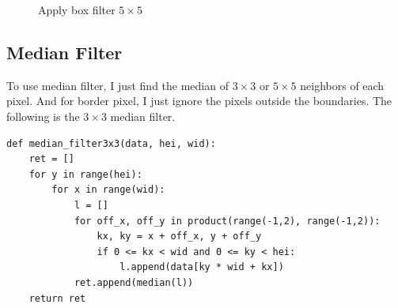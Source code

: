 \documentclass[14pt,a4paper]{extarticle}
\begin{document}
\begin{figure}[H]
\centering
	\hfill
\caption{Apply box filter $5 \times 5$}
\end{figure}

\subsection{Median Filter}

To use median filter, I just find the median of $3 \times 3$ or $5 \times 5$ neighbors of each pixel. And for border pixel, I just ignore the pixels outside the boundaries. The following is the $3 \times 3$ median filter.
\begin{lstlisting}
def median_filter3x3(data, hei, wid):
	ret = []
	for y in range(hei):
		for x in range(wid):
			l = []
			for off_x, off_y in product(range(-1,2), range(-1,2)):
				kx, ky = x + off_x, y + off_y
				if 0 <= kx < wid and 0 <= ky < hei:
					l.append(data[ky * wid + kx])
			ret.append(median(l))
	return ret
\end{lstlisting}
\end{document}
